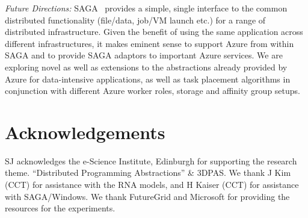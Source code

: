 \documentclass[conference,final]{IEEEtran}
\newcommand{\up}{\vspace*{-1em}}
\def\acknowledgementname{Acknowledgements}
\newenvironment{acknowledgement}%
{\section*{\acknowledgementname}%
\parindent=0pt%
}
\newcommand{\alnote}[1]{ {\textcolor{blue} { ***AL: #1 }}}
\newcommand{\jhanote}[1]{ {\textcolor{red} { ***SJ: #1 }}}
\newcommand{\alnote}[1]{}
\newcommand{\jhanote}[1]{}
\begin{document}
{\it Future Directions:} SAGA~\cite{saga_url} provides a simple,
single interface to the common distributed functionality (file/data,
job/VM launch etc.) for a range of distributed infrastructure.  Given
the benefit of using the same application across different
infrastructures, it makes eminent sense to support Azure from within
SAGA and to provide SAGA adaptors to important Azure services. %
We are exploring novel as well as extensions to the abstractions
already provided by Azure for data-intensive applications, as well as
task placement algorithms in conjunction with different Azure worker
roles, storage and affinity group setups.
  
  

  


\up
\begin{acknowledgement} 
  \up \footnotesize{%
    SJ acknowledges the e-Science Institute, Edinburgh for supporting
    the research theme. ``Distributed Programming Abstractions'' \&
    3DPAS.  We thank J Kim (CCT) for assistance with the RNA models,
    and H Kaiser (CCT) for assistance with SAGA/Windows. We thank
    FutureGrid and Microsoft for providing the resources for the
    experiments.}
\end{acknowledgement}

\up

%

\end{document}
